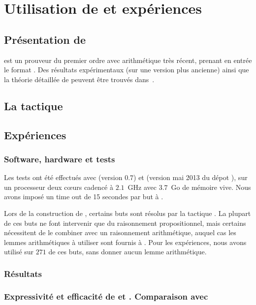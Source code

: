 \section{Utilisation de \beagle et expériences}
\label{sec:experiences}

\subsection{Présentation de \beagle}
\beagle est un prouveur du premier ordre avec arithmétique très récent,
prenant en entrée le format \tff. Des résultats expérimentaux (sur une
version plus ancienne) ainsi que la théorie détaillée de \beagle peuvent être trouvés dans~\cite{DBLP:conf/cade/BaumgartnerW13}.


\subsection{La tactique \beagletac}
\label{sec:experiences:beagletac}



\subsection{Expériences}
\label{sec:experiences:experiences}

\subsubsection{Software, hardware et tests}
Les tests ont été effectués avec \beagle (version $0.7$) et \holfour (version mai 2013 du dépot ), sur un processeur deux cœurs cadencé à $2.1$~GHz avec $3.7$~Go de mémoire vive. 
Nous avons imposé un time out de 15 secondes par but à \beagle.
 
Lors de la construction de \holfour, certains buts sont résolus par la
tactique \metistac. La plupart de ces buts ne font intervenir que du
raisonnement propositionnel, mais certains nécessitent de le combiner
avec un raisonnement arithmétique, auquel cas les lemmes arithmétiques à
utiliser sont fournis à \metistac. Pour les expériences, nous avons
utilisé \beagletac sur $271$ de ces buts, sans donner aucun lemme
arithmétique.


\subsubsection{Résultats}


\subsubsection{Expressivité et efficacité de \beagletac et \beagle. Comparaison avec \metistac}
